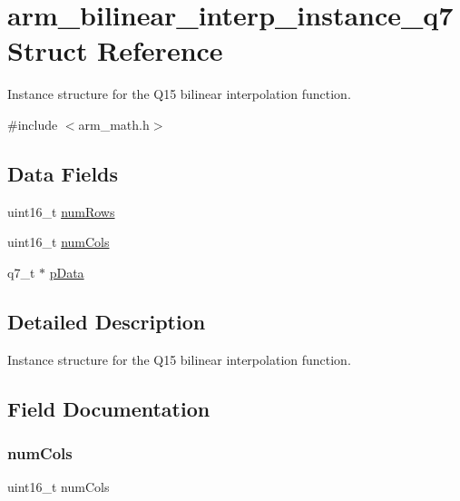 \hypertarget{structarm__bilinear__interp__instance__q7}{}\section{arm\+\_\+bilinear\+\_\+interp\+\_\+instance\+\_\+q7 Struct Reference}
\label{structarm__bilinear__interp__instance__q7}


Instance structure for the Q15 bilinear interpolation function.  




{\ttfamily \#include $<$arm\+\_\+math.\+h$>$}

\subsection*{Data Fields}
\begin{DoxyCompactItemize}
\item 
uint16\+\_\+t \mbox{\hyperlink{structarm__bilinear__interp__instance__q7_a1bcf80ccdc2acc29198f1592ae300390}{num\+Rows}}
\item 
uint16\+\_\+t \mbox{\hyperlink{structarm__bilinear__interp__instance__q7_a4bb5ec0d13eb4c9cf887aa8366a44117}{num\+Cols}}
\item 
q7\+\_\+t $\ast$ \mbox{\hyperlink{structarm__bilinear__interp__instance__q7_afde7546ea2ec5df9fe42fb04d128a016}{p\+Data}}
\end{DoxyCompactItemize}


\subsection{Detailed Description}
Instance structure for the Q15 bilinear interpolation function. 

\subsection{Field Documentation}
\mbox{\label{structarm__bilinear__interp__instance__q7_a4bb5ec0d13eb4c9cf887aa8366a44117}} 
\subsubsection{\texorpdfstring{num\+Cols}{numCols}}
{\footnotesize\ttfamily uint16\+\_\+t num\+Cols}

